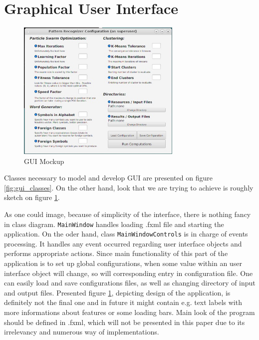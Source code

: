\documentclass{mini}
\begin{document}
\section{Graphical User Interface}

%
%
\begin{figure}
    \begin{center}
        \includegraphics[width=0.7\textwidth]{images/mock_gui.jpg}
    \end{center}
    \caption{GUI Mockup}
    \label{fig:gui_look}
\end{figure}

Classes necessary to model and develop GUI are presented on figure \ref{fig:gui_classes}. On the other hand, look that we are trying to achieve is roughly sketch on figure \ref{fig:gui_look}.

As one could image, because of simplicity of the interface, there is nothing fancy in class diagram. \texttt{MainWindow} handles loading .fxml file and starting the application. On the oder hand, class \texttt{MainWindowControls} is in charge of events processing. It handles any event occurred regarding user interface objects and performs appropriate actions. Since main functionality of this part of the application is to set up global configurations, when some value within an user interface object will change, so will corresponding entry in configuration file. One can easily load and save configurations files, as well as changing directory of input and output files. Presented figure \ref{fig:gui_look}, depicting design of the application, is definitely not the final one and in future it might contain e.g. text labels with more informations about features or some loading bars. Main look of the program should be defined in .fxml, which will not be presented in this paper due to its irrelevancy and numerous way of implementations. 
\end{document}
